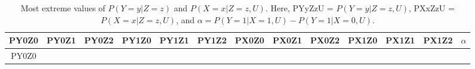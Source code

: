 \documentclass[
]{article}
\theoremstyle{plain}
\begin{document}
\begin{longtable}[]{@{}ccccccccccccc@{}}
\caption{Most extreme values of \(P(Y = y | Z = z)\) and \(P(X = x | Z = z, U)\). Here, PYyZzU = \(P(Y = y | Z = z, U)\), PXxZzU = \(P(X = x | Z = z, U)\), and \(\alpha = P(Y = 1 | X = 1,U) - P(Y = 1 | X = 0,U)\).}\tabularnewline
\toprule
\begin{minipage}[b]{0.05\columnwidth}\centering
PY0Z0\strut
\end{minipage} & \begin{minipage}[b]{0.05\columnwidth}\centering
PY0Z1\strut
\end{minipage} & \begin{minipage}[b]{0.05\columnwidth}\centering
PY0Z2\strut
\end{minipage} & \begin{minipage}[b]{0.05\columnwidth}\centering
PY1Z0\strut
\end{minipage} & \begin{minipage}[b]{0.05\columnwidth}\centering
PY1Z1\strut
\end{minipage} & \begin{minipage}[b]{0.05\columnwidth}\centering
PY1Z2\strut
\end{minipage} & \begin{minipage}[b]{0.05\columnwidth}\centering
PX0Z0\strut
\end{minipage} & \begin{minipage}[b]{0.05\columnwidth}\centering
PX0Z1\strut
\end{minipage} & \begin{minipage}[b]{0.05\columnwidth}\centering
PX0Z2\strut
\end{minipage} & \begin{minipage}[b]{0.05\columnwidth}\centering
PX1Z0\strut
\end{minipage} & \begin{minipage}[b]{0.05\columnwidth}\centering
PX1Z1\strut
\end{minipage} & \begin{minipage}[b]{0.05\columnwidth}\centering
PX1Z2\strut
\end{minipage} & \begin{minipage}[b]{0.07\columnwidth}\centering
\(\alpha\)\strut
\end{minipage}\tabularnewline
\midrule
\endfirsthead
\toprule
\begin{minipage}[b]{0.05\columnwidth}\centering
PY0Z0\strut
\end{minipage} & \begin{minipage}[b]{0.05\columnwidth}\centering

\end{minipage}
\end{longtable}
\end{document}
